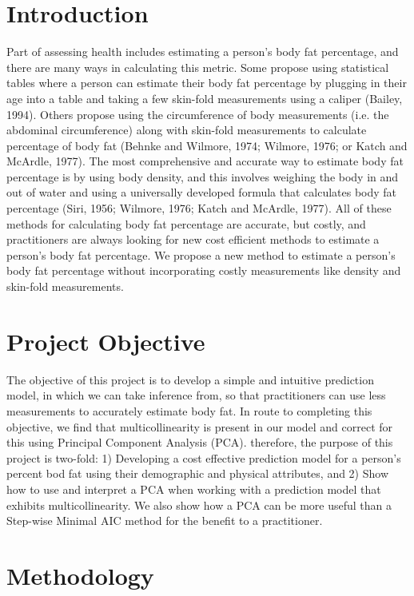 \documentclass[letterpaper, 12pt]{article}
\begin{document}
	\pagebreak
		
	\section{Introduction}

	Part of assessing health includes estimating a person’s body fat percentage, and there are many ways in calculating this metric.  Some propose using statistical tables where a person can estimate their body fat percentage by plugging in their age into a table and taking a few skin-fold measurements using a caliper (Bailey, 1994).  Others propose using the circumference of body measurements (i.e. the abdominal circumference) along with skin-fold measurements to calculate percentage of body fat (Behnke and Wilmore, 1974; Wilmore, 1976; or Katch and McArdle, 1977).  The most comprehensive and accurate way to estimate body fat percentage is by using body density, and this involves weighing the body in and out of water and using a universally developed formula that calculates body fat percentage (Siri, 1956; Wilmore, 1976; Katch and McArdle, 1977).  All of these methods for calculating body fat percentage are accurate, but costly, and practitioners are always looking for new cost efficient methods to estimate a person's body fat percentage.  We propose a new method to estimate a person's body fat percentage without incorporating costly measurements like density and skin-fold measurements.
	
	\section{Project Objective}
	
	The objective of this project is to develop a simple and intuitive prediction model, in which we can take inference from, so that practitioners can use less measurements to accurately estimate body fat.  In route to completing this objective, we find that multicollinearity is present in our model and correct for this using Principal Component Analysis (PCA).  therefore, the purpose of this project is two-fold: 1) Developing a cost effective prediction model for a person's percent bod fat using their demographic and physical attributes, and 2) Show how to use and interpret a PCA when working with a prediction model that exhibits multicollinearity.  We also show how a PCA can be more useful than a Step-wise Minimal AIC method for the benefit to a practitioner.
	
	\section{Methodology}
	
\end{document}
